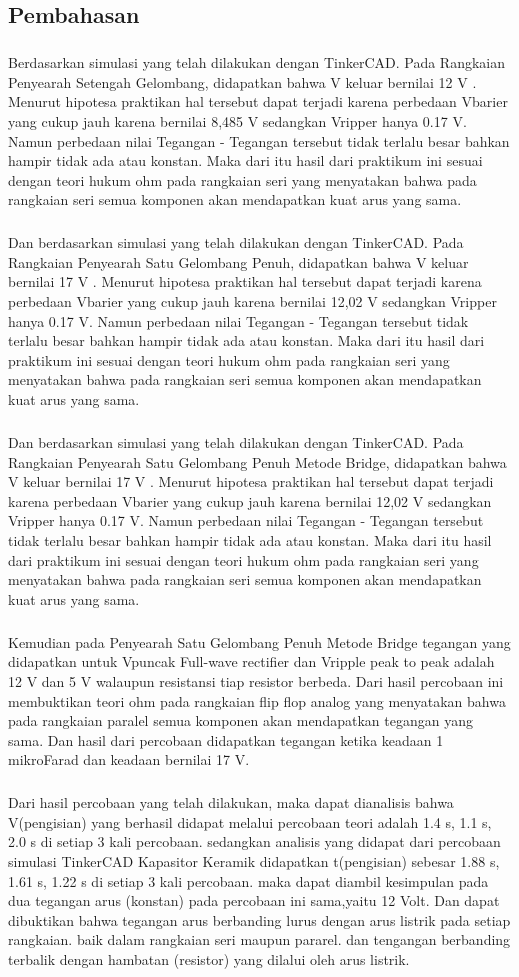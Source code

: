 \documentclass[12pt,a4paper]{article}
\begin{document}
\subsection{Pembahasan}
\subparagraph{}
	Berdasarkan simulasi yang telah dilakukan dengan TinkerCAD. Pada Rangkaian Penyearah Setengah Gelombang, didapatkan bahwa V keluar bernilai 12 V . Menurut hipotesa praktikan hal tersebut dapat terjadi karena perbedaan Vbarier yang cukup jauh karena bernilai 8,485 V sedangkan Vripper hanya 0.17 V. Namun perbedaan nilai Tegangan - Tegangan tersebut tidak terlalu besar bahkan hampir tidak ada atau konstan. Maka dari itu hasil dari praktikum ini sesuai dengan teori hukum ohm pada rangkaian seri yang menyatakan bahwa pada rangkaian seri semua komponen akan mendapatkan kuat arus yang sama.
\subparagraph{ }
	Dan berdasarkan simulasi yang telah dilakukan dengan TinkerCAD. Pada Rangkaian Penyearah Satu Gelombang Penuh, didapatkan bahwa V keluar bernilai 17 V . Menurut hipotesa praktikan hal tersebut dapat terjadi karena perbedaan Vbarier yang cukup jauh karena bernilai 12,02 V sedangkan Vripper hanya 0.17 V. Namun perbedaan nilai Tegangan - Tegangan tersebut tidak terlalu besar bahkan hampir tidak ada atau konstan. Maka dari itu hasil dari praktikum ini sesuai dengan teori hukum ohm pada rangkaian seri yang menyatakan bahwa pada rangkaian seri semua komponen akan mendapatkan kuat arus yang sama.
\subparagraph{ }
	Dan berdasarkan simulasi yang telah dilakukan dengan TinkerCAD. Pada Rangkaian Penyearah Satu Gelombang Penuh Metode Bridge, didapatkan bahwa V keluar bernilai 17 V . Menurut hipotesa praktikan hal tersebut dapat terjadi karena perbedaan Vbarier yang cukup jauh karena bernilai 12,02 V sedangkan Vripper hanya 0.17 V. Namun perbedaan nilai Tegangan - Tegangan tersebut tidak terlalu besar bahkan hampir tidak ada atau konstan. Maka dari itu hasil dari praktikum ini sesuai dengan teori hukum ohm pada rangkaian seri yang menyatakan bahwa pada rangkaian seri semua komponen akan mendapatkan kuat arus yang sama.
\subparagraph{ }
	Kemudian pada Penyearah Satu Gelombang Penuh Metode Bridge tegangan yang didapatkan untuk Vpuncak Full-wave rectifier dan Vripple peak to peak adalah 12 V dan 5 V walaupun resistansi tiap resistor berbeda. Dari hasil percobaan ini membuktikan teori ohm pada rangkaian flip flop analog yang menyatakan bahwa pada rangkaian paralel semua komponen akan mendapatkan tegangan yang sama. Dan hasil dari percobaan didapatkan tegangan ketika keadaan 1 mikroFarad dan keadaan bernilai 17 V.
\subparagraph{ }
	Dari hasil percobaan yang telah dilakukan, maka dapat dianalisis bahwa V(pengisian) yang berhasil didapat melalui percobaan teori adalah 1.4 s, 1.1 s, 2.0 s di setiap 3 kali percobaan. sedangkan analisis yang didapat dari percobaan simulasi TinkerCAD Kapasitor Keramik didapatkan t(pengisian) sebesar 1.88 s, 1.61 s, 1.22 s di setiap 3 kali percobaan. maka dapat diambil kesimpulan pada dua tegangan arus (konstan) pada percobaan ini sama,yaitu 12 Volt. Dan dapat dibuktikan bahwa tegangan arus berbanding lurus dengan arus listrik pada setiap rangkaian. baik dalam rangkaian seri maupun pararel. dan tengangan berbanding terbalik dengan hambatan (resistor) yang dilalui oleh arus listrik.
\end{document}
